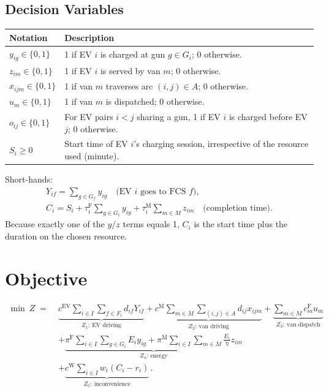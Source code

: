 \documentclass[12pt,a4paper]{article}
\begin{document}
\newpage
\subsection*{Decision Variables}
\begin{tabularx}{\textwidth}{@{}>{\raggedright\arraybackslash}p{4.6cm}X@{}}
\toprule
\textbf{Notation} & \textbf{Description} \\
\midrule
$y_{ig}\in\{0,1\}$ & 1 if EV $i$ is charged at gun $g\in G_i$; 0 otherwise. \\[2pt]
$z_{im}\in\{0,1\}$ & 1 if EV $i$ is served by van $m$; 0 otherwise. \\[2pt]
$x_{ijm}\in\{0,1\}$ & 1 if van $m$ traverses arc $(i,j)\in A$; 0 otherwise. \\[2pt]
$u_m\in\{0,1\}$ & 1 if van $m$ is dispatched; 0 otherwise. \\[2pt]
$o_{ij}\in\{0,1\}$ & For EV pairs $i<j$ sharing a gun, 1 if EV $i$ is charged before EV $j$; 0 otherwise. \\[2pt]
$S_i\ge0$ & Start time of EV $i$'s charging session, irrespective of the resource used (minute). \\
\bottomrule
\end{tabularx}

Short-hands:
\begin{gather*}
Y_{if}=\sum_{g\in G_f}y_{ig}\quad\text{(EV $i$ goes to FCS $f$)},\\
C_i=S_i+\tau^{\mathrm F}_i\sum_{g\in G_i}y_{ig}+\tau^{\mathrm M}_i\sum_{m\in M}z_{im}\quad\text{(completion time)}.
\end{gather*}
Because exactly one of the $y/z$ terms equals 1, $C_i$ is the start time plus the duration on the chosen resource.

\section{Objective}

\begin{equation}
\begin{aligned}
\min\ Z \;=\;& \underbrace{c^{\mathrm{EV}}\sum_{i\in I}\sum_{f\in F_i}d_{if}Y_{if}}_{Z_1:\ \text{EV driving}}
+\underbrace{c^{\mathrm M}\sum_{m\in M}\sum_{(i,j)\in A}d_{ij}x_{ijm}}_{Z_2:\ \text{van driving}}
+\underbrace{\sum_{m\in M}c^{\mathrm F}_mu_m}_{Z_3:\ \text{van dispatch}}\\
&+\underbrace{\pi^{\mathrm F}\sum_{i\in I}\sum_{g\in G_i}E_iy_{ig}+\pi^{\mathrm M}\sum_{i\in I}\sum_{m\in M}\frac{E_i}{\eta}z_{im}}_{Z_4:\ \text{energy}}\\
&+\underbrace{c^{\mathrm W}\sum_{i\in I}w_i(C_i-r_i)}_{Z_5:\ \text{inconvenience}}\,.
\end{aligned}\label{eq:obj}
\end{equation}
\end{document}
